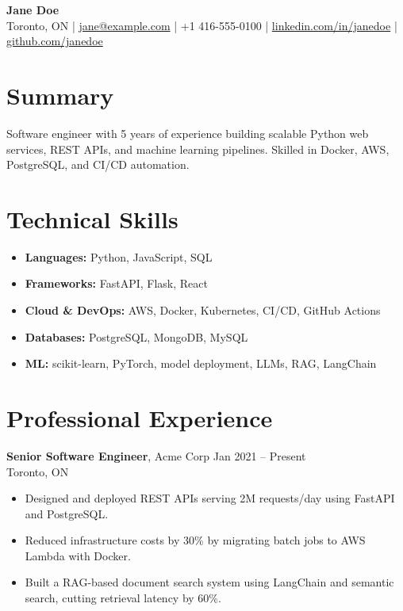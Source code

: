 \documentclass[10pt, letterpaper]{article}
\begin{document}
\begin{center}
    {\Large \textbf{Jane Doe}}\\[4pt]
    Toronto, ON \quad|\quad
    \href{mailto:jane@example.com}{jane@example.com} \quad|\quad
    +1 416-555-0100 \quad|\quad
    \href{https://linkedin.com/in/janedoe}{linkedin.com/in/janedoe} \quad|\quad
    \href{https://github.com/janedoe}{github.com/janedoe}
\end{center}

\section*{Summary}
Software engineer with 5 years of experience building scalable Python web services, REST APIs,
and machine learning pipelines. Skilled in Docker, AWS, PostgreSQL, and CI/CD automation.

\section*{Technical Skills}
\begin{itemize}[leftmargin=*]
    \item \textbf{Languages:} Python, JavaScript, SQL
    \item \textbf{Frameworks:} FastAPI, Flask, React
    \item \textbf{Cloud \& DevOps:} AWS, Docker, Kubernetes, CI/CD, GitHub Actions
    \item \textbf{Databases:} PostgreSQL, MongoDB, MySQL
    \item \textbf{ML:} scikit-learn, PyTorch, model deployment, LLMs, RAG, LangChain
\end{itemize}

\section*{Professional Experience}

\textbf{Senior Software Engineer}, Acme Corp \hfill Jan 2021 -- Present\\
Toronto, ON
\begin{itemize}[leftmargin=*]
    \item Designed and deployed REST APIs serving 2M requests/day using FastAPI and PostgreSQL.
    \item Reduced infrastructure costs by 30\% by migrating batch jobs to AWS Lambda with Docker.
    \item Built a RAG-based document search system using LangChain and semantic search, cutting
          retrieval latency by 60\%.
\end{itemize}
\end{document}

